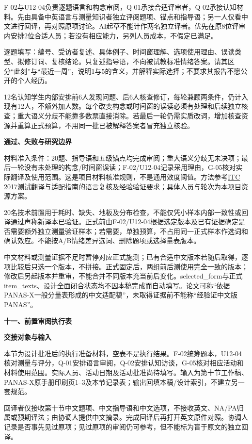 \documentclass[11pt,a4paper]{article}
\newcommand{\reviewsection}[1]{\par\Needspace{6\baselineskip}\begin{center}{\titlelatin\titlecjk\bfseries\fontsize{14}{20}\selectfont #1}\end{center}}
\newcommand{\reviewsubsection}[1]{\par\Needspace{4\baselineskip}\begin{center}{\titlelatin\titlecjk\bfseries\fontsize{12}{18}\selectfont #1}\end{center}}
\begin{document}
F-02与U12-04负责逐题语言和构念审阅，Q-01承接合适评审者，Q-02承接认知材料。先由具备中英语言与测量知识者独立评阅题项、锚点和指导语；另一人仅看中文进行回译，再对照原项讨论。AI起草不能计作两名独立译者。优先在原8位评审内安排2位合适人员；若没有相应能力，另列人员成本，不假定已满足。

逐题填写：编号、受访者复述、具体例子、时间窗理解、选项使用理由、误读类型、拟修订词、复核结论。只复述指导语，不向被试教标准情绪答案。请其区分“此刻”与“最近一周”，说明1与5的含义，并解释实际选择；不要求其报告不愿公开的个人经历。

12名认知学生内部安排前6人发现问题、后6人核查修订，每轮兼顾两条件，仍计入现有12人，不额外加人数。每个改变构念或时间窗的误读必须有处理和后续独立核查；重大语义分歧不能靠多数票直接消除。若最后一轮仍需实质改词，增加核查资源并重算正式预算，不用同一批已被解释答案者冒充独立核验。

\reviewsubsection{10.3 通过、失败与研究边界}
材料准入条件：20题、指导语和五级锚点均完成审阅；重大语义分歧无未决项；最后一轮没有未处理的构念/时间窗误读；F-02/U12-04记录采用理由，G-05核对实际翻译及使用范围。这是项目材料核准规则，不是通用效度阈值。方法参考\href{https://www.intestcom.org/files/guideline_test_adaptation_2ed.pdf}{ITC 2017测试翻译与适配指南}的语言复核及经验验证要求；具体人员与轮次为本项目资源方案。

20名技术前置用于耗时、缺失、地板及分布检查，不能仅凭小样本内部一致性或回译通过声称新译本已验证。正式前由F-02/U12-04根据选定版本及已有证据确定是否需要额外独立测量验证样本；若需要，单独预算，不占用同一正式样本作选词和确认效应。不能按A/B情绪差异选词、删除题项或选择量表版本。

中文材料或测量证据不足时暂停对应正式施测；已有合适中文版本若随后取得，逐项比较后只选一个版本，不拼接。正式固定后，两组前后测使用完全一致的版本；修改后另起版本并重审，不能合并不同版本充当前后变化。selected\_form与正式item\_texts、设计全面闭合状态均不因本稿完成而自动填写。论文可称“依据PANAS-X一般分量表形成的中文适配稿”，未取得证据前不能称“经验证中文版PANAS”。


\newpage\reviewsection{十一、前置审阅执行表}
\reviewsubsection{11.1 交接对象与输入}
本节为设计批准后的执行准备材料，空表不是执行结果。F-02统筹题本，U12-04核对测量与评分，Q-01安排语言审阅，Q-02安排认知访谈，G-05核对相应活动和材料使用范围。实际人员、活动日期及活动批准尚待填写。输入为第十节工作稿、PANAS-X原手册印刷页1--3及本节记录表；输出回填本稿/设计索引，不建立另一套规范。

回译者仅接收第十节中文题项、中文指导语和中文选项，不接收英文、NA/PA归属或预期译法；由协调人提供中文摘录。完成回译后再打开英文原件对照。协调人记录是否事先见过原项；见过原项的审阅仍可参考，但不能标为盲于原文的独立回译。
\end{document}
